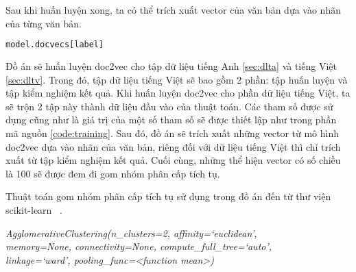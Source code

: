 Sau khi huấn luyện xong, ta có thể trích xuất vector của văn bản dựa vào nhãn của từng văn bản.
\begin{lstlisting}[language=Python]
model.docvecs[label]
\end{lstlisting}

Đồ án sẽ huấn luyện doc2vec cho tập dữ liệu tiếng Anh \ref{sec:dlta} và tiếng Việt \ref{sec:dltv}.
Trong đó, tập dữ liệu tiếng Việt sẽ bao gồm 2 phần: tập huấn luyện và tập kiểm nghiệm kết quả.
Khi huấn luyện doc2vec cho phần dữ liệu tiếng Việt, ta sẽ trộn 2 tập này thành dữ liệu đầu vào của thuật toán.
Các tham số được sử dụng cũng như là giá trị của một số tham số sẽ được thiết lập như trong phần mã nguồn \ref{code:training}.
Sau đó, đồ án sẽ trích xuất những vector từ mô hình doc2vec dựa vào nhãn của văn bản, riêng đối với dữ liệu tiếng Việt thì chỉ trích xuất từ tập kiểm nghiệm kết quả.
Cuối cùng, những thể hiện vector có số chiều là 100 sẽ được đem đi gom nhóm phân cấp tích tụ.

Thuật toán gom nhóm phân cấp tích tụ sử dụng trong đồ án đến từ thư viện scikit-learn ~\cite{hac-scikit}.

\label{ahc-scikit}
\textit{AgglomerativeClustering(n{\_}clusters=2, affinity=`euclidean', \\
memory=None, connectivity=None, compute{\_}full{\_}tree=`auto', \\
linkage=`ward', pooling{\_}func=<function mean>)}

